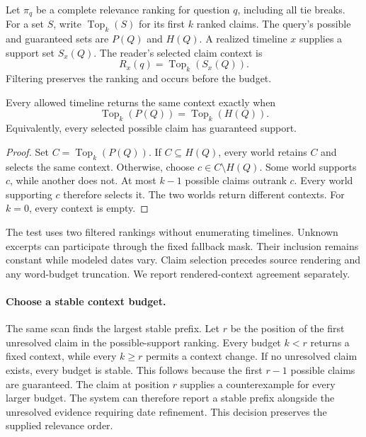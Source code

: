 Let $\pi_q$ be a complete relevance ranking for question $q$, including all tie breaks.
For a set $S$, write $\operatorname{Top}_k(S)$ for its first $k$ ranked claims.
The query's possible and guaranteed sets are $P(Q)$ and $H(Q)$.
A realized timeline $x$ supplies a support set $S_x(Q)$.
The reader's selected claim context is
\begin{equation}
 R_x(q)=\operatorname{Top}_k(S_x(Q)).
\label{eq:context}
\end{equation}
Filtering preserves the ranking and occurs before the budget.

\begin{theorem}
\label{thm:context-stability}
Every allowed timeline returns the same context exactly when
\begin{equation}
 \operatorname{Top}_k(P(Q))=\operatorname{Top}_k(H(Q)).
\label{eq:context-stability}
\end{equation}
Equivalently, every selected possible claim has guaranteed support.
\end{theorem}
\begin{proof}
Set $C=\operatorname{Top}_k(P(Q))$.
If $C\subseteq H(Q)$, every world retains $C$ and selects the same context.
Otherwise, choose $c\in C\setminus H(Q)$.
Some world supports $c$, while another does not.
At most $k-1$ possible claims outrank $c$.
Every world supporting $c$ therefore selects it.
The two worlds return different contexts.
For $k=0$, every context is empty.
\end{proof}

The test uses two filtered rankings without enumerating timelines.
Unknown excerpts can participate through the fixed fallback mask.
Their inclusion remains constant while modeled dates vary.
Claim selection precedes source rendering and any word-budget truncation.
We report rendered-context agreement separately.

\paragraph{Choose a stable context budget.}
The same scan finds the largest stable prefix.
Let $r$ be the position of the first unresolved claim in the possible-support ranking.
Every budget $k<r$ returns a fixed context, while every $k\ge r$ permits a context change.
If no unresolved claim exists, every budget is stable.
This follows because the first $r-1$ possible claims are guaranteed.
The claim at position $r$ supplies a counterexample for every larger budget.
The system can therefore report a stable prefix alongside the unresolved evidence requiring date refinement.
This decision preserves the supplied relevance order.

